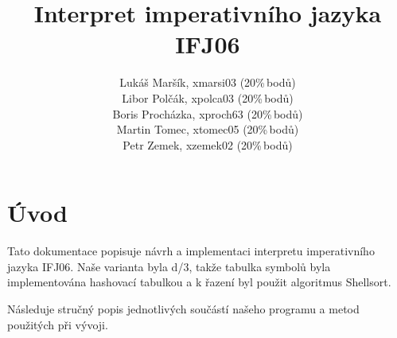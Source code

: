 \documentclass[11pt, notitlepage]{article}
\title{Interpret imperativního jazyka IFJ06}
\author{
Lukáš Maršík, xmarsi03    (20\%\,bodů) \\
Libor Polčák, xpolca03    (20\%\,bodů) \\
Boris Procházka, xproch63 (20\%\,bodů) \\
Martin Tomec, xtomec05    (20\%\,bodů) \\
Petr Zemek,   xzemek02    (20\%\,bodů) \\
}
\begin{document}
\maketitle


\pagestyle{plain}
\setcounter{page}{2}


\section{Úvod}
Tato dokumentace popisuje návrh a implementaci interpretu imperativního jazyka IFJ06. Naše varianta byla d/3, takže tabulka symbolů byla implementována hashovací tabulkou a k řazení byl použit algoritmus Shellsort.

Následuje stručný popis jednotlivých součástí našeho programu a metod použitých při vývoji.











\newpage %






\end{document}
